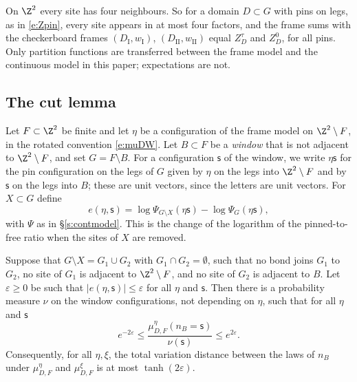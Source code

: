 On $\Z^2$ every site has four neighbours. So for a domain $D \subset G$ with pins on legs, as in \eqref{e:Zpin}, every site appears in at most four factors, and the frame sums with the checkerboard frames $(D_{\mathrm I}, w_{\mathrm I})$, $(D_{\mathrm{II}}, w_{\mathrm{II}})$ equal $Z^\tau_D$ and $Z^0_D$, for all pins. Only partition functions are transferred between the frame model and the continuous model in this paper; expectations are not.

\subsection{The cut lemma}\label{s:cutlemma}

Let $F \subset \Z^2$ be finite and let $\eta$ be a configuration of the frame model on $\Z^2 \setminus F$, in the rotated convention \eqref{e:muDW}. Let $B \subset F$ be a \emph{window} that is not adjacent to $\Z^2 \setminus F$, and set $G = F \setminus B$. For a configuration $\mathsf s$ of the window, we write $\eta \mathsf s$ for the pin configuration on the legs of $G$ given by $\eta$ on the legs into $\Z^2 \setminus F$ and by $\mathsf s$ on the legs into $B$; these are unit vectors, since the letters are unit vectors. For $X \subset G$ define
\begin{equation}\label{e:cutcost}
e(\eta, \mathsf s) = \log \Psi_{G \setminus X}(\eta \mathsf s) - \log \Psi_G(\eta \mathsf s),
\end{equation}
with $\Psi$ as in \S\ref{s:contmodel}. This is the change of the logarithm of the pinned-to-free ratio when the sites of $X$ are removed.

\begin{lemma}\label{l:cut}
Suppose that $G \setminus X = G_1 \cup G_2$ with $G_1 \cap G_2 = \emptyset$, such that no bond joins $G_1$ to $G_2$, no site of $G_1$ is adjacent to $\Z^2 \setminus F$, and no site of $G_2$ is adjacent to $B$. Let $\varepsilon \ge 0$ be such that $|e(\eta, \mathsf s)| \le \varepsilon$ for all $\eta$ and $\mathsf s$. Then there is a probability measure $\nu$ on the window configurations, not depending on $\eta$, such that for all $\eta$ and $\mathsf s$
\begin{equation}\label{e:cutratio}
e^{-2 \varepsilon} \le \frac{\mu^\eta_{D, F}(n_B = \mathsf s)}{\nu(\mathsf s)} \le e^{2 \varepsilon} .
\end{equation}
Consequently, for all $\eta, \xi$, the total variation distance between the laws of $n_B$ under $\mu^\eta_{D, F}$ and $\mu^\xi_{D, F}$ is at most $\tanh(2 \varepsilon)$.
\end{lemma}

